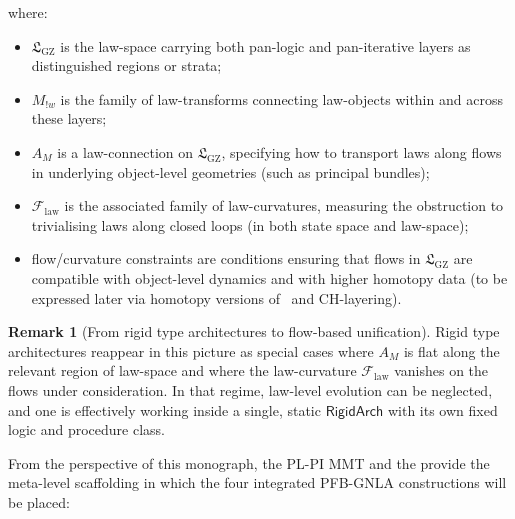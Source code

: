 \documentclass[11pt]{book}
\theoremstyle{plain}
\theoremstyle{definition}
\newtheorem{remark}[theorem]{Remark}
\newcommand{\GFramework}{\text{G-Framework}} \newcommand{\GAlgebra}{\text{G-Algebra}}
\newcommand{\GZLS}{\ensuremath{\mathfrak{L}_{\mathrm{GZ}}}}       \newcommand{\GZLT}{\ensuremath{M_{!w}}}                           \newcommand{\GZLOC}{\ensuremath{A_M}}                             \newcommand{\GZLCurv}{\ensuremath{\mathcal{F}_{\mathrm{law}}}}
\begin{document}
where:

\begin{itemize}
  \item $\GZLS$ is the law-space carrying both pan-logic and
        pan-iterative layers as distinguished regions or strata;
  \item $\GZLT$ is the family of law-transforms connecting law-objects
        within and across these layers;
  \item $\GZLOC$ is a law-connection on \GZLS, specifying how to
        transport laws along flows in underlying object-level
        geometries (such as principal bundles);
  \item $\GZLCurv$ is the associated family of law-curvatures,
        measuring the obstruction to trivialising laws along closed
        loops (in both state space and law-space);
  \item flow/curvature constraints are conditions ensuring that flows
        in $\GZLS$ are compatible with object-level dynamics and with
        higher homotopy data (to be expressed later via homotopy
        versions of \GAlgebra\ and CH-layering).
\end{itemize}



\begin{remark}[From rigid type architectures to flow-based unification]
  Rigid type architectures reappear in this picture as special
  cases where $\GZLOC$ is flat along the relevant region of law-space
  and where the law-curvature $\GZLCurv$ vanishes on the flows under
  consideration. In that regime, law-level evolution can be neglected,
  and one is effectively working inside a single, static
  $\mathsf{RigidArch}$ with its own fixed logic and procedure class.
\end{remark}

From the perspective of this monograph, the PL-PI MMT and the
\GFramework provide the meta-level scaffolding in which the four
integrated PFB-GNLA constructions will be placed:
\end{document}
